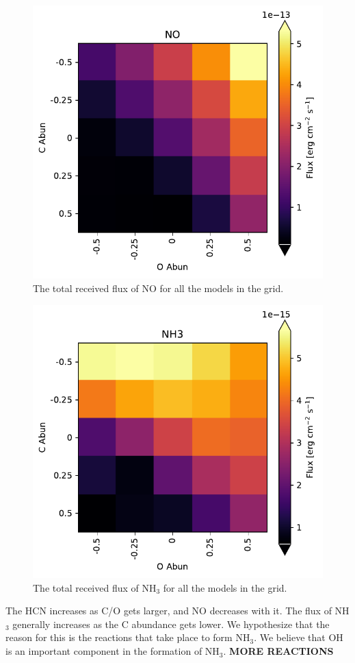 \documentclass[twoside, single, authoryear, semicolon]{lion-msc}
\newcommand{\3}{$_3$}
\newcommand{\2}{$_2$}
\begin{document}
\begin{figure}[!ht]
    \centering
    \includegraphics[width=0.5\linewidth]{Figures/NO_heatmap.pdf}
    \caption{The total received flux of NO for all the models in the grid.}
    \label{fig:flux NO}
\end{figure}
\begin{figure}[!ht]
    \centering
    \includegraphics[width=0.5\linewidth]{Figures/NH3_heatmap.pdf}
    \caption{The total received flux of NH\3 for all the models in the grid.}
    \label{fig:flux NH3}
\end{figure}

The HCN increases as C/O gets larger, and NO decreases with it. The flux of NH\3 generally increases as the C abundance gets lower. We hypothesize that the reason for this is the reactions that take place to form NH\3.
We believe that OH is an important component in the formation of NH\3. 
\textbf{MORE REACTIONS}
\end{document}
